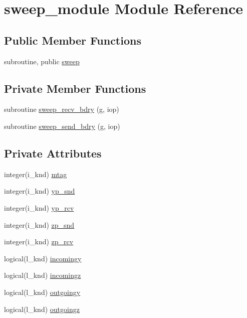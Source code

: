 \hypertarget{classsweep__module}{\section{sweep\-\_\-module Module Reference}
\label{classsweep__module}
}
\subsection*{Public Member Functions}
\begin{DoxyCompactItemize}
\item 
subroutine, public \hyperlink{classsweep__module_a45a5eecf232e44843a1c763f5ce7c4eb}{sweep}
\end{DoxyCompactItemize}
\subsection*{Private Member Functions}
\begin{DoxyCompactItemize}
\item 
subroutine \hyperlink{classsweep__module_a3603dc59f232d8d9309bb434f09b9c53}{sweep\-\_\-recv\-\_\-bdry} (g, iop)
\item 
subroutine \hyperlink{classsweep__module_a4eb92bcf3c9cd5265030a030fe7c7937}{sweep\-\_\-send\-\_\-bdry} (g, iop)
\end{DoxyCompactItemize}
\subsection*{Private Attributes}
\begin{DoxyCompactItemize}
\item 
integer(i\-\_\-knd) \hyperlink{classsweep__module_a39fa545755e54cbd311b4fe016cfa439}{mtag}
\item 
integer(i\-\_\-knd) \hyperlink{classsweep__module_a1aab688bcb2aaa33a5bf60e57385d575}{yp\-\_\-snd}
\item 
integer(i\-\_\-knd) \hyperlink{classsweep__module_a709eb6789a39f6937645ba7022192e99}{yp\-\_\-rcv}
\item 
integer(i\-\_\-knd) \hyperlink{classsweep__module_a5d8635df65a44c026ab27c08910d91d8}{zp\-\_\-snd}
\item 
integer(i\-\_\-knd) \hyperlink{classsweep__module_a2e606e13d5d6df88605a757235d90f15}{zp\-\_\-rcv}
\item 
logical(l\-\_\-knd) \hyperlink{classsweep__module_a2169c5c3d0b58d4481c11c192d77139d}{incomingy}
\item 
logical(l\-\_\-knd) \hyperlink{classsweep__module_a0a5733d013646bed24b58e6e63c1f348}{incomingz}
\item 
logical(l\-\_\-knd) \hyperlink{classsweep__module_a951a915875e576860980173b5ae9f23d}{outgoingy}
\item 
logical(l\-\_\-knd) \hyperlink{classsweep__module_a219e782e7e79e82858addb91583fcae8}{outgoingz}
\end{DoxyCompactItemize}


